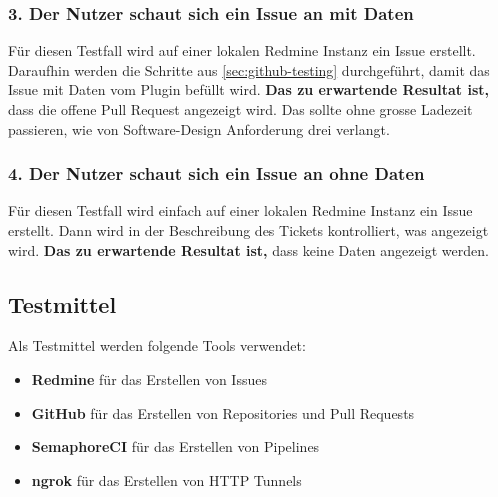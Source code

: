 \subsubsection{3. Der Nutzer schaut sich ein Issue an mit Daten}
Für diesen Testfall wird auf einer lokalen Redmine Instanz ein Issue erstellt. Daraufhin werden die Schritte aus
\ref{sec:github-testing} durchgeführt, damit das Issue mit Daten vom Plugin befüllt wird. \newline
\textbf{Das zu erwartende Resultat ist,} dass die offene Pull Request angezeigt wird. Das sollte ohne grosse Ladezeit passieren, wie von 
Software-Design Anforderung drei verlangt.

\subsubsection{4. Der Nutzer schaut sich ein Issue an ohne Daten}
Für diesen Testfall wird einfach auf einer lokalen Redmine Instanz ein Issue erstellt. Dann wird in der Beschreibung des Tickets
kontrolliert, was angezeigt wird. \newline
\textbf{Das zu erwartende Resultat ist,} dass keine Daten angezeigt werden.

\subsection{Testmittel}
Als Testmittel werden folgende Tools verwendet:
\begin{itemize}
  \item \textbf{Redmine} für das Erstellen von Issues
  \item \textbf{GitHub} für das Erstellen von Repositories und Pull Requests
  \item \textbf{SemaphoreCI} für das Erstellen von Pipelines
  \item \textbf{ngrok} für das Erstellen von HTTP Tunnels
\end{itemize}
